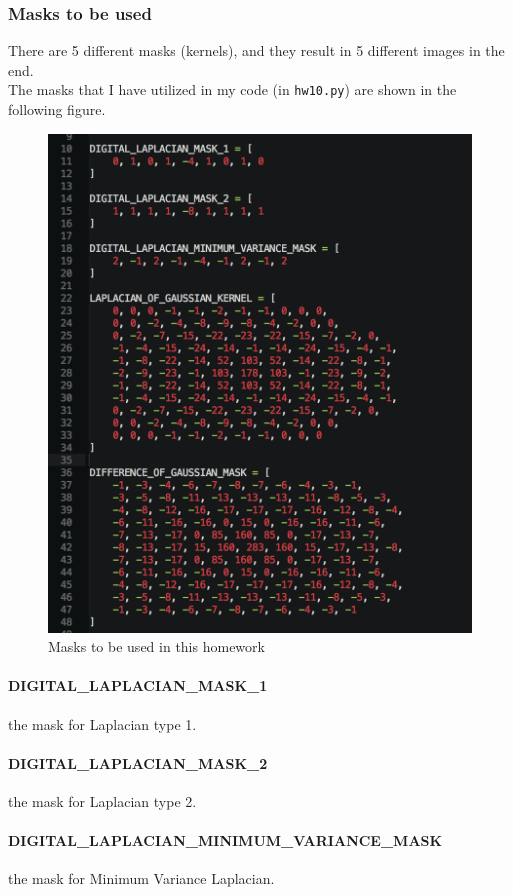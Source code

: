 \documentclass{article}
\newcommand{\code}[1]{\texttt{#1}}
\begin{document}
\subsubsection{Masks to be used}
There are 5 different masks (kernels), and they result in 5 different images in the end. \\
The masks that I have utilized in my code (in \code{hw10.py}) are shown in the following figure.
\begin{figure}[H]
  \includegraphics[width=\linewidth]{img/masks.png}
  \caption{Masks to be used in this homework}
  \label{fig:masks}
\end{figure}
\paragraph{DIGITAL\_LAPLACIAN\_MASK\_1} the mask for Laplacian type 1.
\paragraph{DIGITAL\_LAPLACIAN\_MASK\_2} the mask for Laplacian type 2.
\paragraph{DIGITAL\_LAPLACIAN\_MINIMUM\_VARIANCE\_MASK} the mask for Minimum Variance Laplacian.
\end{document}
